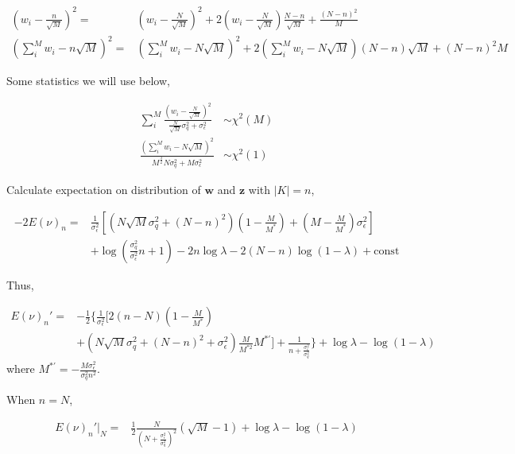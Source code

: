 \begin{equation}
\begin{aligned}
    (w_i-\frac{n}{\sqrt{M}})^2 =& (w_i - \frac{N}{\sqrt{M}})^2 + 2(w_i - \frac{N}{\sqrt{M}})\frac{N-n}{\sqrt{M}} + \frac{(N-n)^2}{M} \\
    (\sum_i^M w_i-n\sqrt{M})^2 =& (\sum_i^M w_i-N\sqrt{M})^2 + 2(\sum_i^M w_i-N\sqrt{M})(N-n)\sqrt{M} + (N-n)^2M
\end{aligned}
\end{equation}

Some statistics we will use below,

\begin{equation}
\begin{aligned}
    \sum_i^M\frac{(w_i - \frac{N}{\sqrt{M}})^2}{\frac{N}{\sqrt{M}}\sigma_q^2+\sigma_\epsilon^2} &\sim \chi^2(M) \\
    \frac{(\sum_i^M w_i-N\sqrt{M})^2}{M^{\frac{3}{2}}N\sigma_q^2+M\sigma_\epsilon^2} &\sim \chi^2(1)
\end{aligned}
\end{equation}

Calculate expectation on distribution of $\bm{w}$ and $\bm{z}$ with $|K|=n$, 

\begin{equation}
\begin{aligned}
    -2E(\nu)_n =& \frac{1}{\sigma_\epsilon^2}[(N\sqrt{M}\sigma_q^2+(N-n)^2)(1-\frac{M}{M^\ast})+(M-\frac{M}{M^\ast})\sigma_\epsilon^2] \\
    &+ \log(\frac{\sigma_q^2}{\sigma_\epsilon^2}n+1) - 2n\log\lambda - 2(N-n)\log(1-\lambda) + \mathrm{const}
\end{aligned}
\end{equation}

Thus, 

\begin{equation}
\begin{aligned}
    E(\nu)_n' =& -\frac{1}{2}\{\frac{1}{\sigma_\epsilon^2}[2(n-N)(1-\frac{M}{M^\ast}) \\
    &+(N\sqrt{M}\sigma_q^2+(N-n)^2+\sigma_\epsilon^2)\frac{M}{M^{\ast2}}M^{\ast'}] +\frac{1}{n+\frac{\sigma_\epsilon^2}{\sigma_q^2}}\} + \log\lambda - \log(1-\lambda)
\end{aligned}
\end{equation}
where $M^{\ast'}=-\frac{M\sigma_\epsilon^2}{\sigma_q^2n^2}$. 

When $n=N$,

\begin{equation}
\begin{aligned}
    E(\nu)_n'|_N =& \frac{1}{2}\frac{N}{(N+\frac{\sigma_\epsilon^2}{\sigma_q^2})^2}(\sqrt{M}-1) + \log\lambda - \log(1-\lambda)
\end{aligned}
\end{equation}

